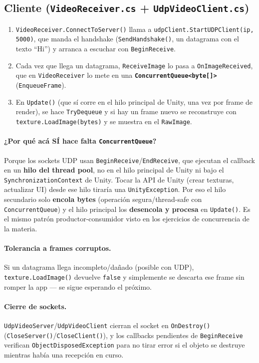 \documentclass[11pt,a4paper]{article}
\begin{document}
\subsection{Cliente (\texttt{VideoReceiver.cs} + \texttt{UdpVideoClient.cs})}
\begin{enumerate}
  \item \texttt{VideoReceiver.ConnectToServer()} llama a \texttt{udpClient.StartUDPClient(ip, 5000)}, que manda el handshake (\texttt{SendHandshake()}, un datagrama con el texto ``Hi'') y arranca a escuchar con \texttt{BeginReceive}.
  \item Cada vez que llega un datagrama, \texttt{ReceiveImage} lo pasa a \texttt{OnImageReceived}, que en \texttt{VideoReceiver} lo mete en una \textbf{\texttt{ConcurrentQueue<byte[]>}} (\texttt{EnqueueFrame}).
  \item En \texttt{Update()} (que sí corre en el hilo principal de Unity, una vez por frame de render), se hace \texttt{TryDequeue} y si hay un frame nuevo se reconstruye con \texttt{texture.LoadImage(bytes)} y se muestra en el \texttt{RawImage}.
\end{enumerate}

\paragraph{¿Por qué acá SÍ hace falta \texttt{ConcurrentQueue}?}
Porque los sockets UDP usan \texttt{BeginReceive}/\texttt{EndReceive}, que ejecutan el
callback en un \textbf{hilo del thread pool}, no en el hilo principal de Unity ni
bajo el \texttt{SynchronizationContext} de Unity. Tocar la API de Unity (crear
texturas, actualizar UI) desde ese hilo tiraría una \texttt{UnityException}. Por
eso el hilo secundario solo \textbf{encola bytes} (operación segura/thread-safe
con \texttt{ConcurrentQueue}) y el hilo principal los \textbf{desencola y procesa} en
\texttt{Update()}. Es el mismo patrón productor-consumidor visto en los ejercicios
de concurrencia de la materia.

\paragraph{Tolerancia a frames corruptos.} Si un datagrama llega incompleto/dañado
(posible con UDP), \texttt{texture.LoadImage()} devuelve \texttt{false} y simplemente se
descarta ese frame sin romper la app — se sigue esperando el próximo.

\paragraph{Cierre de sockets.} \texttt{UdpVideoServer}/\texttt{UdpVideoClient} cierran el socket en
\texttt{OnDestroy()} (\texttt{CloseServer()}/\texttt{CloseClient()}), y los callbacks pendientes
de \texttt{BeginReceive} verifican \texttt{ObjectDisposedException} para no tirar error si
el objeto se destruye mientras había una recepción en curso.
\end{document}
